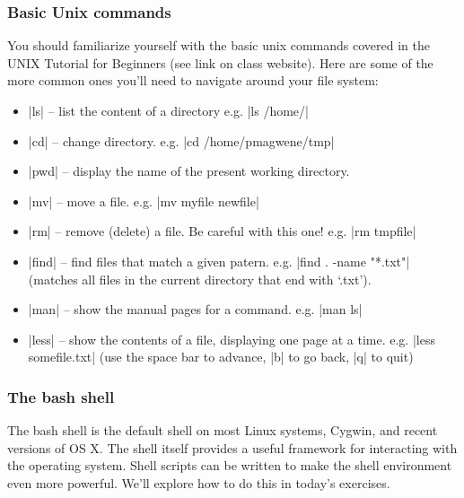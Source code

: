 \subsubsection{Basic Unix commands}

You should familiarize yourself with the basic unix commands covered in the UNIX Tutorial for Beginners (see link on class website).  Here are some of the more common ones you'll need to navigate around your file system:

\begin{itemize}
\item |ls| -- list the content of a directory e.g. |ls /home/|
\item |cd| -- change directory.  e.g. |cd /home/pmagwene/tmp|
\item |pwd| -- display the name of the present working directory.
\item |mv| -- move a file. e.g. |mv myfile newfile|
\item |rm| -- remove (delete) a file. Be careful with this one! e.g. |rm tmpfile|
\item |find| -- find files that match a given patern. e.g. |find . -name "*.txt"| (matches all files in the current directory that end with `.txt').
\item |man| -- show the manual pages for a command. e.g. |man ls|
\item |less| -- show the contents of a file, displaying one page at a time. e.g. |less somefile.txt| (use the space bar to advance, |b| to go back, |q| to quit)
\end{itemize}


\subsubsection{The bash shell}

The bash shell is the default shell on most Linux systems, Cygwin, and recent versions of OS X.  The shell itself provides a useful framework for interacting with the operating system. Shell scripts can be written to make the shell environment even more powerful. We'll explore how to do this in today's exercises. 


